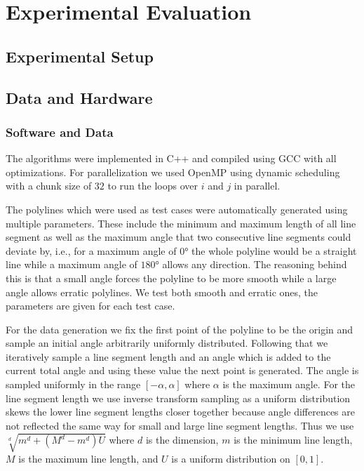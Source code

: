 



\section{Experimental Evaluation}
\label{sec:evaluation}
\subsection{Experimental Setup}
\label{subsec:exp_setup}

\subsection{Data and Hardware}
\label{subsec:hardware}

\subsubsection{Software and Data}
\label{subsubsec:software}
The algorithms were implemented in C++ and compiled using GCC with all optimizations. For parallelization we used OpenMP using dynamic scheduling with a chunk size of \(32\) to run the loops over \(i\) and \(j\) in parallel. 

The polylines which were used as test cases were automatically generated using multiple parameters. These include the minimum and maximum length of all line segment as well as the maximum angle that two consecutive line segments could deviate by, i.e., for a maximum angle of \(0\)° the whole polyline would be a straight line while a maximum angle of \(180\)° allows any direction. The reasoning behind this is that a small angle forces the polyline to be more smooth while a large angle allows erratic polylines. We test both smooth and erratic ones, the parameters are given for each test case. 

For the data generation we fix the first point of the polyline to be the origin and sample an initial angle arbitrarily uniformly distributed. Following that we iteratively sample a line segment length and an angle which is added to the current total angle and using these value the next point is generated. The angle is sampled uniformly in the range \([-\alpha, \alpha]\) where \(\alpha\) is the maximum angle. For the line segment length we use inverse transform sampling as a uniform distribution skews the lower line segment lengths closer together because angle differences are not reflected the same way for small and large line segment lengths. Thus we use \(\sqrt[d]{m^d + (M^d - m^d) U}\) where \(d\) is the dimension, \(m\) is the minimum line length, \(M\) is the maximum line length, and \(U\) is a uniform distribution on \([0,1]\).

